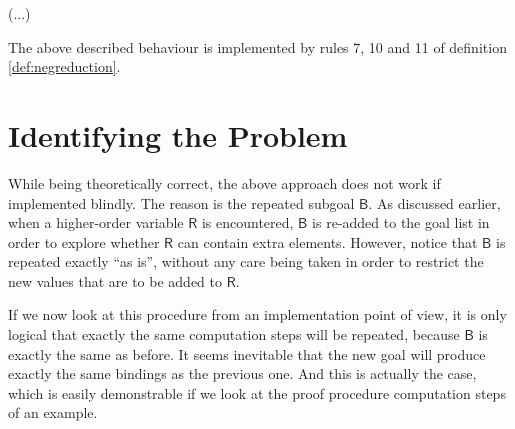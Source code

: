 \documentclass[inscr,ack,preface]{dithesis}
\theoremstyle{definition}
\newcommand{\msf}[1]{$\mathsf{#1}$}
\begin{document}
(...)

The above described behaviour is implemented by rules 7, 10 and 11 of definition \ref{def:negreduction}.

\section{Identifying the Problem}
While being theoretically correct, the above approach does not work if implemented blindly. The reason is the repeated subgoal \msf{B}. As discussed earlier, when a higher-order variable \msf{R} is encountered, \msf{B} is re-added to the goal list in order to explore whether \msf{R} can contain extra elements. However, notice that \msf{B} is repeated exactly ``as is'', without any care being taken in order to restrict the new values that are to be added to \msf{R}.

If we now look at this procedure from an implementation point of view, it is only logical that exactly the same computation steps will be repeated, because \msf{B} is exactly the same as before. It seems inevitable that the new goal will produce exactly the same bindings as the previous one. And this is actually the case, which is easily demonstrable if we look at the proof procedure computation steps of an example.
\end{document}
